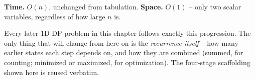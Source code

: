 \begin{complexitybox}
\textbf{Time.} $O(n)$, unchanged from tabulation.
\textbf{Space.} $O(1)$ -- only two scalar variables, regardless of how
large $n$ is.
\end{complexitybox}

\begin{takeawaybox}
Every later 1D DP problem in this chapter follows exactly this
progression. The only thing that will change from here on is the
\emph{recurrence itself} -- how many earlier states each step depends on,
and how they are combined (summed, for counting; minimized or maximized,
for optimization). The four-stage scaffolding shown here is reused
verbatim.
\end{takeawaybox}
